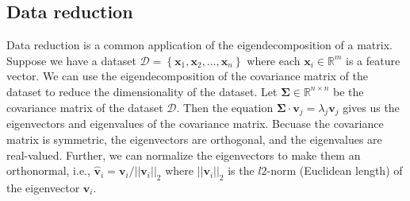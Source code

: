 \documentclass{article}[11pt]
\def\D{\mathcal{D}}
\newcommand{\norm}[1]{\left|\left|#1\right|\right|}
\begin{document}
\subsection*{Data reduction}
Data reduction is a common application of the eigendecomposition of a matrix. Suppose we have a dataset $\D = \left\{\mathbf{x}_{1},\mathbf{x}_{2},\dots,\mathbf{x}_{n}\right\}$ where each $\mathbf{x}_{i}\in\mathbb{R}^{m}$ is a feature vector.
We can use the eigendecomposition of the covariance matrix of the dataset to reduce the dimensionality of the dataset.
Let $\mathbf{\Sigma}\in\mathbb{R}^{n\times{n}}$ be the covariance matrix of the dataset $\D$. 
Then the equation $\mathbf{\Sigma}\cdot\mathbf{v}_{j} = \lambda_{j}\mathbf{v}_{j}$ gives us the eigenvectors and eigenvalues of the covariance matrix.
Becuase the covariance matrix is symmetric, the eigenvectors are orthogonal, and the eigenvalues are real-valued.
Further, we can normalize the eigenvectors to make them an orthonormal, 
i.e., $\hat{\mathbf{v}}_{i} = \mathbf{v}_{i}/\norm{\mathbf{v}_{i}}_{2}$ where $\norm{\mathbf{v}_{i}}_{2}$ is the $l2$-norm (Euclidean length) of the eigenvector $\mathbf{v}_{i}$.
\end{document}
